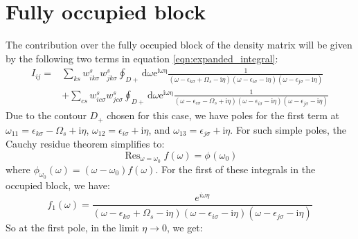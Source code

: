 \documentclass[12pt]{caltech_thesis}
\begin{document}
\section{Fully occupied block}
The contribution over the fully occupied block of the density matrix will be given by the following two terms in equation \ref{eqn:expanded_integral}:
\begin{equation}
\begin{aligned}
I_{ij} =& \sum_{ks} w_{i k \sigma}^s w_{j k \sigma}^s \oint_{D+} \mathrm{d} \omega \mathrm{e}^{\mathrm{i \omega \eta}} \frac{1}{(\omega-\epsilon_{k \sigma}+\Omega_s-\mathrm{i} \eta)(\omega-\epsilon_{i \sigma}-\mathrm{i} \eta)(\omega-\epsilon_{j \sigma}-\mathrm{i} \eta)}\\
& + \sum_{cs} w_{i c \sigma}^s w_{j c \sigma}^s \oint_{D+} \mathrm{d} \omega \mathrm{e}^{\mathrm{i \omega \eta}} \frac{1}{(\omega-\epsilon_{c \sigma}-\Omega_s+\mathrm{i} \eta)(\omega-\epsilon_{i \sigma}-\mathrm{i} \eta)(\omega-\epsilon_{j \sigma}-\mathrm{i} \eta)}
\end{aligned}
\end{equation}
Due to the contour $D_+$ chosen for this case, we have poles for the first term at $\omega_{11} = \epsilon _{k\sigma } - \Omega _s + \mathrm{i} \eta$, $\omega_{12} = \epsilon _{i\sigma } + \mathrm{i} \eta$, and $\omega_{13} = \epsilon _{j\sigma } + \mathrm{i} \eta$. For such simple poles, the Cauchy residue theorem simplifies to:
\begin{equation}
\operatorname{Res}_{\omega =\omega _0} f(\omega )= \phi^{}\left(\omega _0\right)
\label{eqn:cauchy_residue}
\end{equation}
where $\phi_{\omega _0}(\omega ) = (\omega - \omega_0) f(\omega )$. For the first of these integrals in the occupied block, we have:
\begin{equation}
f_1(\omega) = \frac{e^{i\omega \eta }}{(\omega-\epsilon_{k \sigma}+\Omega_s-\mathrm{i} \eta)(\omega-\epsilon_{i \sigma}-\mathrm{i} \eta)(\omega-\epsilon_{j \sigma}-\mathrm{i} \eta)}
\end{equation}
So at the first pole, in the limit $\eta \to 0$, we get:
\end{document}
